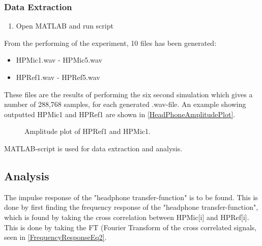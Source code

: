 \subsubsection{Data Extraction}
\begin{enumerate}
	\item Open MATLAB\textsuperscript{\textregistered} and run script 
\end{enumerate}

From the performing of the experiment, 10 files has been generated:
\begin{itemize}
	\item HPMic1.wav - HPMic5.wav
	\item HPRef1.wav - HPRef5.wav
\end{itemize}

These files are the results of performing the six second simulation which gives a number of 288,768 samples, for each generated .wav-file.
An example showing outputted HPMic1 and HPRef1 are shown in  \autoref{HeadPhoneAmplitudePlot}.


\begin{figure}[H]
	\centering
	
	\caption{Amplitude plot of HPRef1 and HPMic1.}
	\label{HeadPhoneAmplitudePlot}
\end{figure}

MATLAB\textsuperscript{\textregistered}-script  is used for data extraction and analysis.


\subsection{Analysis}
The impulse response of the "headphone transfer-function" is to be found.
This is done by first finding the frequency response of the "headphone transfer-function", which is found by taking the cross correlation between HPMic[i] and HPRef[i]. This is done by taking the FT (Fourier Transform of the cross correlated signals, seen in \autoref{FrequencyResponseEq2}.




